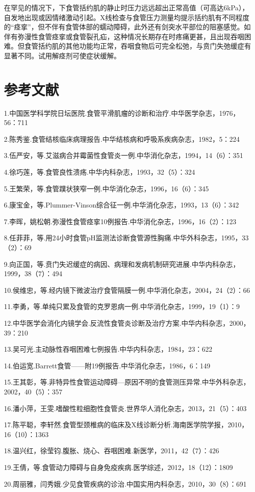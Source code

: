 在罕见的情况下，下食管括约肌的静止时压力远远超出正常高值（可高达6kPa），自发地出现或因情绪激动引起。X线检查与食管压力测量均提示括约肌有不同程度的“痉挛”，但不伴有食管体部的蠕动障碍，此外还有剑突水平部位的阻塞感觉。如伴有弥漫性食管痉挛或食管裂孔疝，这种情况长期存在时疼痛更甚，且出现吞咽困难。但食管括约肌的其他功能均正常，吞咽食物后可完全松弛，与贲门失弛缓症有显著不同。试用解痉剂可使症状缓解。

\protect\hypertarget{text00159.html}{}{}

\section{参考文献}

1.中国医学科学院日坛医院.食管平滑肌瘤的诊断和治疗.中华医学杂志，1976，56：711

2.陈秀鉴.食管结核临床病理报告.中华结核病和呼吸系疾病杂志，1982，5：224

3.伍严安，等.艾滋病合并霉菌性食管炎一例.中华消化杂志，1994，14（6）：351

4.徐巧莲，等.食管良性溃疡.中华内科杂志，1993，32（5）：324

5.王繁荣，等.食管蹼状狭窄一例.中华消化杂志，1996，16（6）：345

6.康宝金，等.Plummer-Vinson综合征一例.中华消化杂志，1993，13（6）：342

7.李晖，姚松朝.弥漫性食管痉挛10例报告.中华消化杂志，1996，16（2）：123

8.任菲菲，等.用24小时食管pH监测法诊断食管源性胸痛.中华外科杂志，1995，33（2）：69

9.向正国，等.贲门失迟缓症的病因、病理和发病机制研究进展.中华内科杂志，1999，38（7）：494

10.侯维忠，等.经内镜下微波治疗食管隔膜一例.中华消化杂志，2004，24（2）：66

11.李勇，等.单纯只累及食管的克罗恩病一例.中华消化杂志，1999，19（1）：9

12.中华医学会消化内镜学会.反流性食管炎诊断及治疗方案.中华内科杂志，2000，39：210

13.吴可光.主动脉性吞咽困难七例报告.中华内科杂志，1984，23：622

14.伯运宽.Barrett食管------附19例报告.中华消化杂志，1986，6：149

15.王其彰，等.非特异性食管运动障碍---原因不明的食管测压异常.中华外科杂志，2002，40（5）：357

16.潘小萍，王雯.嗜酸性粒细胞性食管炎.世界华人消化杂志，2013，21（5）：403

17.陈平聪，李轩然.食管型颈椎病的临床及X线诊断分析.海南医学院学报，2010，16（10）：1363

18.温兴红，徐莹钧.腹胀、烧心、吞咽困难.新医学，2011，42（7）：426

19.王倩，等.食管动力障碍与自身免疫疾病.医学综述，2012，18（12）：1809

20.周丽雅，闫秀娥.少见食管疾病的诊治.中国实用内科杂志，2010，30（8）：691

\protect\hypertarget{text00160.html}{}{}

